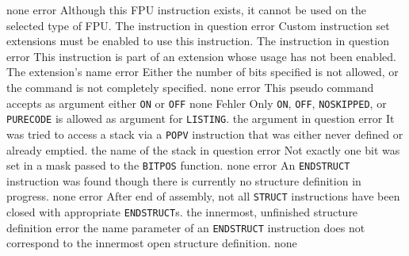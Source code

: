 \documentclass[12pt,twoside]{report}
\newcommand{\tty}[1]{{\tt #1}}
\begin{document}
\begin{description}
               {none}
               {error}
               {Although this FPU instruction exists, it cannot be used on
                the selected type of FPU.}
               {The instruction in question}
               {error}
               {Custom instruction set extensions must be enabled
                to use this instruction.}
               {The instruction in question}
               {error}
               {This instruction is part of an extension whose
                usage has not been enabled.}
               {The extension's name}
               {error}
               {Either the number of bits specified is not allowed, or
                the command is not completely specified.}
               {none}
               {error}
               {This pseudo command accepts as argument either \tty{ON} or
                \tty{OFF}}
               {none}
               {Fehler}
               {Only \tty{ON}, \tty{OFF}, \tty{NOSKIPPED}, or
                \tty{PURECODE} is allowed as argument for \tty{LISTING}.}
               {the argument in question}
               {error}
               {It was tried to access a stack via a \tty{POPV} instruction
                that was either never defined or already emptied.}
               {the name of the stack in question}
               {error}
               {Not exactly one bit was set in a mask passed to the
                \tty{BITPOS} function.}
               {none}
               {error}
               {An \tty{ENDSTRUCT} instruction was found though there is
                currently no structure definition in progress.}
               {none}
               {error}
               {After end of assembly, not all \tty{STRUCT} instructions
                have been closed with appropriate \tty{ENDSTRUCT}s.}
               {the innermost, unfinished structure definition}
               {error}
               {the name parameter of an \tty{ENDSTRUCT} instruction does
                not correspond to the innermost open structure
                definition.}
               {none}

\end{description}
\end{document}
